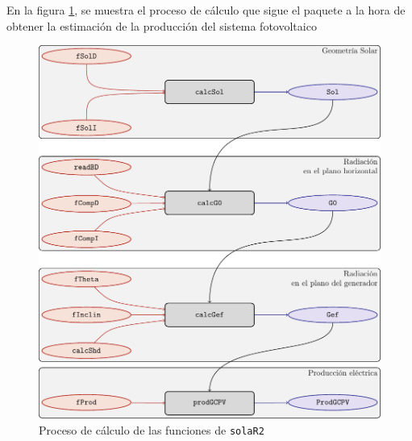 En la figura \ref{fig:orgc6e945c}, se muestra el proceso de cálculo que sigue el paquete a la hora de obtener la estimación de la producción del sistema fotovoltaico
\begin{figure}[t]
\centering
\includegraphics[scale=0.6]{figuras/procedure.pdf}
\caption{\label{fig:orgc6e945c}Proceso de cálculo de las funciones de \texttt{solaR2}}
\end{figure}
